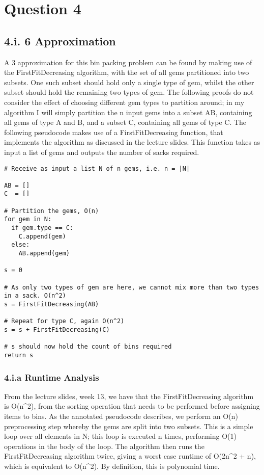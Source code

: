 \documentclass[paper=a4, fontsize=12pt]{article}
\begin{document}
\section{Question 4}

\subsection{4.i. 6 Approximation}

A 3 approximation for this bin packing problem can be found by making use of the FirstFitDecreasing algorithm, with the set of all gems partitioned into two subsets. One such subset should hold only a single type of gem, whilst the other subset should hold the remaining two types of gem. The following proofs do not consider the effect of choosing different gem types to partition around; in my algorithm I will simply partition the n input gems into a subset AB, containing all gems of type A and B, and a subset C, containing all gems of type C. The following pseudocode makes use of a FirstFitDecreasing function, that implements the algorithm as discussed in the lecture slides. This function takes as input a list of gems and outputs the number of sacks required.

\begin{verbatim}
# Receive as input a list N of n gems, i.e. n = |N|

AB = []
C  = []

# Partition the gems, O(n)
for gem in N:
  if gem.type == C:
    C.append(gem)
  else:
    AB.append(gem)

s = 0

# As only two types of gem are here, we cannot mix more than two types in a sack. O(n^2)
s = FirstFitDecreasing(AB)

# Repeat for type C, again O(n^2)
s = s + FirstFitDecreasing(C)

# s should now hold the count of bins required
return s
\end{verbatim}

\subsubsection{4.i.a Runtime Analysis}
From the lecture slides, week 13, we have that the FirstFitDecreasing algorithm is O(n^2), from the sorting operation that needs to be performed before assigning items to bins. As the annotated pseudocode describes, we perform an O(n) preprocessing step whereby the gems are split into two subsets. This is a simple loop over all elements in N; this loop is executed n times, performing O(1) operations in the body of the loop. The algorithm then runs the FirstFitDecreasing algorithm twice, giving a worst case runtime of O(2n^2 + n), which is equivalent to O(n^2). By definition, this is polynomial time.
\end{document}
